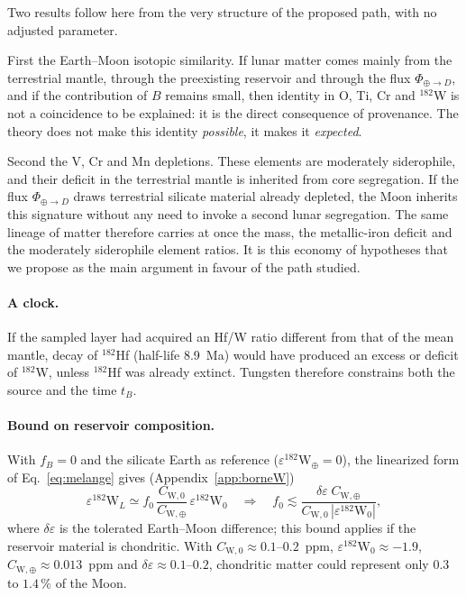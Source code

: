 \documentclass[11pt,a4paper,openany]{report}
\begin{document}
\begin{apport}
Two results follow here from the very structure of the proposed path, with no adjusted parameter.

First the Earth--Moon isotopic similarity. If lunar matter comes mainly from the terrestrial mantle,
through the preexisting reservoir and through the flux $\Phi_{\oplus\to D}$, and if the contribution
of $B$ remains small, then identity in O, Ti, Cr and $^{182}$W is not a coincidence to be explained:
it is the direct consequence of provenance. The theory does not make this identity \emph{possible},
it makes it \emph{expected}.

Second the V, Cr and Mn depletions. These elements are moderately siderophile, and their deficit in
the terrestrial mantle is inherited from core segregation. If the flux $\Phi_{\oplus\to D}$ draws
terrestrial silicate material already depleted, the Moon inherits this signature without any need to
invoke a second lunar segregation. The same lineage of matter therefore carries at once the mass,
the metallic-iron deficit and the moderately siderophile element ratios. It is this economy of
hypotheses that we propose as the main argument in favour of the path studied.
\end{apport}

\paragraph{A clock.}
If the sampled layer had acquired an Hf/W ratio different from that of the mean mantle, decay of
$^{182}$Hf (half-life 8.9~Ma) would have produced an excess or deficit of $^{182}$W, unless
$^{182}$Hf was already extinct. Tungsten therefore constrains both the source and the time $t_B$.

\paragraph{Bound on reservoir composition.}
With $f_B=0$ and the silicate Earth as reference ($\varepsilon^{182}\mathrm{W}_\oplus=0$), the
linearized form of Eq.~\eqref{eq:melange} gives (Appendix~\ref{app:borneW})
\begin{equation}
\varepsilon^{182}\mathrm{W}_L\simeq f_0\,\frac{C_{\mathrm{W},0}}{C_{\mathrm{W},\oplus}}\,
\varepsilon^{182}\mathrm{W}_0
\quad\Longrightarrow\quad
f_0\lesssim\frac{\delta\varepsilon\;C_{\mathrm{W},\oplus}}{C_{\mathrm{W},0}\,|\varepsilon^{182}\mathrm{W}_0|},
\label{eq:bornef0}
\end{equation}
where $\delta\varepsilon$ is the tolerated Earth--Moon difference; this bound applies if the
reservoir material is chondritic. With $C_{\mathrm{W},0}\approx0.1$--$0.2$~ppm,
$\varepsilon^{182}\mathrm{W}_0\approx-1.9$, $C_{\mathrm{W},\oplus}\approx0.013$~ppm and
$\delta\varepsilon\approx0.1$--$0.2$, chondritic matter could represent only $0.3$ to $1.4\,\%$ of
the Moon.
\end{document}
